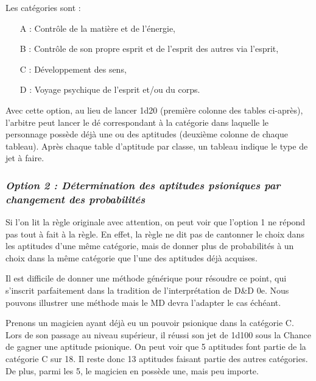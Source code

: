 \documentclass[11pt]{article}
\begin{document}
{\bigskip

Les catégories sont :

\bigskip

\begin{itemize}
\item[A :] Contrôle de la matière et de l'énergie,
\item[B :] Contrôle de son propre esprit et de l'esprit des autres via l'esprit,
\item[C :] Développement des sens,
\item[D :] Voyage psychique de l'esprit et/ou du corps.
\end{itemize}

\bigskip

Avec cette option, au lieu de lancer 1d20 (première colonne des tables ci-après), l'arbitre peut lancer le dé correspondant à la catégorie dans laquelle le personnage possède déjà une ou des aptitudes (deuxième colonne de chaque tableau). Après chaque table d'aptitude par classe, un tableau indique le type de jet à faire.

\subsubsection*{\textit{Option 2 : Détermination des aptitudes psioniques par changement des probabilités}}

Si l'on lit la règle originale avec attention, on peut voir que l'option 1 ne répond pas tout à fait à la règle. En effet, la règle ne dit pas de cantonner le choix dans les aptitudes d'une même catégorie, mais de donner plus de probabilités à un choix dans la même catégorie que l'une des aptitudes déjà acquises.

\bigskip

Il est difficile de donner une méthode générique pour résoudre ce point, qui s'inscrit parfaitement dans la tradition de l'interprétation de D\&D 0e. Nous pouvons illustrer une méthode mais le MD devra l'adapter le cas échéant.

\bigskip

Prenons un magicien ayant déjà eu un pouvoir psionique dans la catégorie C. Lors de son passage au niveau supérieur, il réussi son jet de 1d100 sous la Chance de gagner une aptitude psionique. On peut voir que 5 aptitudes font partie de la catégorie C sur 18. Il reste donc 13 aptitudes faisant partie des autres catégories. De plus, parmi les 5, le magicien en possède une, mais peu importe.

}
\end{document}
